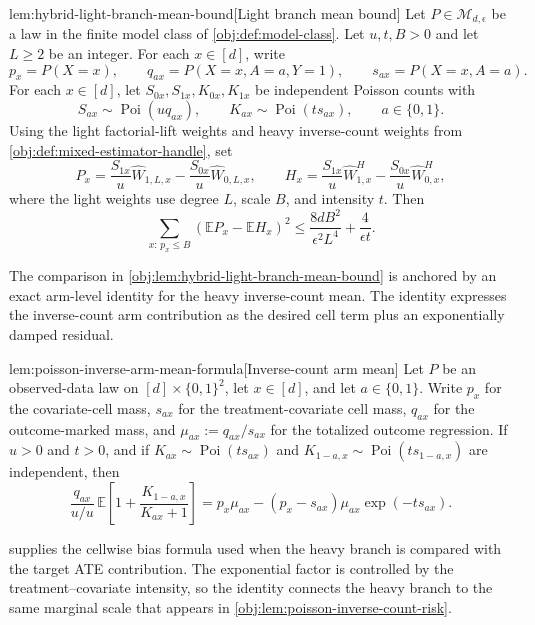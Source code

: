 \begin{lemmav}{lem:hybrid-light-branch-mean-bound}[Light branch mean bound]
Let \(P\in\mathcal M_{d,\epsilon}\) be a law in the finite model class of \cref{obj:def:model-class}.  Let \(u,t,B>0\) and let \(L\ge 2\) be an integer.  For each \(x\in[d]\), write
\[
p_x=P(X=x),\qquad
q_{ax}=P(X=x,A=a,Y=1),\qquad
s_{ax}=P(X=x,A=a).
\]
For each \(x\in[d]\), let \(S_{0x},S_{1x},K_{0x},K_{1x}\) be independent Poisson counts with
\[
S_{ax}\sim \operatorname{Poi}(u q_{ax}),
\qquad
K_{ax}\sim \operatorname{Poi}(t s_{ax}),
\qquad a\in\{0,1\}.
\]
Using the light factorial-lift weights and heavy inverse-count weights from \cref{obj:def:mixed-estimator-handle}, set
\[
P_x
=
\frac{S_{1x}}{u}\widehat W_{1,L,x}
-
\frac{S_{0x}}{u}\widehat W_{0,L,x},
\qquad
H_x
=
\frac{S_{1x}}{u}\widehat W^H_{1,x}
-
\frac{S_{0x}}{u}\widehat W^H_{0,x},
\]
where the light weights use degree \(L\), scale \(B\), and intensity \(t\).  Then
\[
\sum_{x:\,p_x\le B}
\left(\mathbb E P_x-\mathbb E H_x\right)^2
\le
\frac{8dB^2}{\epsilon^2 L^4}
+
\frac{4}{\epsilon t}.
\]
\end{lemmav}

The comparison in \cref{obj:lem:hybrid-light-branch-mean-bound} is anchored by an exact arm-level identity for the heavy inverse-count mean. The identity expresses the inverse-count arm contribution as the desired cell term plus an exponentially damped residual.

\begin{lemmav}{lem:poisson-inverse-arm-mean-formula}[Inverse-count arm mean]
Let \(P\) be an observed-data law on \([d]\times\{0,1\}^2\), let \(x\in[d]\), and let \(a\in\{0,1\}\). Write \(p_x\) for the covariate-cell mass, \(s_{ax}\) for the treatment-covariate cell mass, \(q_{ax}\) for the outcome-marked mass, and \(\mu_{ax}:=q_{ax}/s_{ax}\) for the totalized outcome regression. If \(u>0\) and \(t>0\), and if \(K_{ax}\sim\operatorname{Poi}(t s_{ax})\) and \(K_{1-a,x}\sim\operatorname{Poi}(t s_{1-a,x})\) are independent, then
\[
\frac{q_{ax}}{u/u}\,
\mathbb E\!\left[1+\frac{K_{1-a,x}}{K_{ax}+1}\right]
=
p_x\mu_{ax}-(p_x-s_{ax})\mu_{ax}\exp(-t s_{ax}).
\]
\end{lemmav}

 supplies the cellwise bias formula used when the heavy branch is compared with the target ATE contribution. The exponential factor is controlled by the treatment--covariate intensity, so the identity connects the heavy branch to the same marginal scale that appears in \cref{obj:lem:poisson-inverse-count-risk}.

